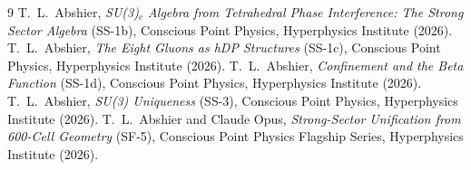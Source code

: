 \documentclass[11pt,a4paper]{article}
\begin{document}
\begin{thebibliography}{9}
 T.~L.~Abshier, \emph{SU(3)$_c$ Algebra from Tetrahedral Phase
Interference: The Strong Sector Algebra} (SS-1b), Conscious Point Physics,
Hyperphysics Institute (2026).
 T.~L.~Abshier, \emph{The Eight Gluons as hDP Structures} (SS-1c),
Conscious Point Physics, Hyperphysics Institute (2026).
 T.~L.~Abshier, \emph{Confinement and the Beta Function} (SS-1d),
Conscious Point Physics, Hyperphysics Institute (2026).
 T.~L.~Abshier, \emph{SU(3) Uniqueness} (SS-3), Conscious Point
Physics, Hyperphysics Institute (2026).
 T.~L.~Abshier and Claude Opus, \emph{Strong-Sector Unification
from 600-Cell Geometry} (SF-5), Conscious Point Physics Flagship Series,
Hyperphysics Institute (2026).
\end{thebibliography}
\end{document}
